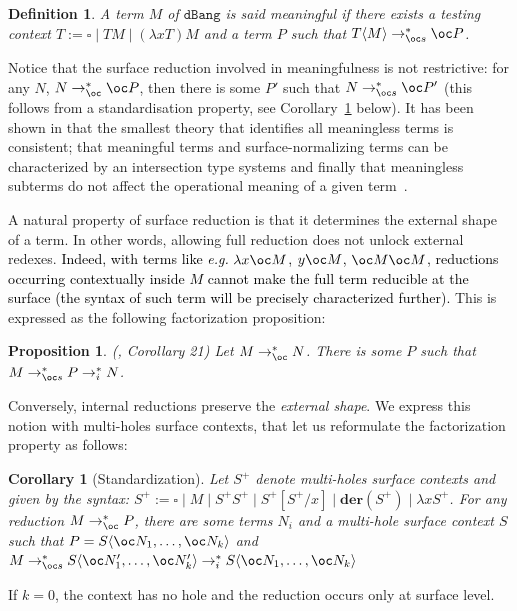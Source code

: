 \documentclass[10pt,a4paper]{article}
\newtheorem{proposition}[theorem]{Proposition}
\newtheorem{corollary}[theorem]{Corollary}
\newtheorem{definition}[theorem]{Definition}
\newcommand{\<}{\langle}
\renewcommand{\>}{\rangle}
\newcommand{\der}[1]{\ensuremath{\mathbf{der}(#1)}}
\newcommand{\dbang}{\ensuremath{\mathtt{dBang}}}
\newcommand{\todbs}{\to_{\oc s}} %
\newcommand{\todbf}{\to_{\oc}} %
\newcommand{\fnl}[1]{\textcolor{black}{#1}}
\begin{document}
\begin{definition}\label{def:dbang_meaningful}
	A term $M$ of $\dbang$ is said \emph{meaningful} if there exists a
	testing context $T:= \square \mid TM \mid (\lambda x T)M$ and a term $P$ such that $T\<M\>\todbs^*\oc P$.
\end{definition}

Notice that the surface reduction involved in meaningfulness is not
restrictive: for any $N$, $N\todbf^*\oc P$, then there is some $P'$
such that $N\todbs^*\oc P'$ (this follows from a standardisation
property, see Corollary~\ref{cor:standardisation_dbang} below). It has been shown in
\cite{kag24} that the smallest theory that
identifies all meaningless terms is consistent; that meaningful terms and surface-normalizing
terms can be characterized by an intersection type
systems and finally that meaningless subterms
do not affect the operational meaning of a given term~\cite[Proposition 8, Theorem 24 and Corollary
11]{kag24}.

A natural property of surface reduction is that it determines the external shape
of a term. In other words, allowing full reduction does not unlock external
redexes. \fnl{Indeed, with terms like \emph{e.g.} $\lambda x\oc M$, $y\oc M$, $\oc M\oc M$,
reductions occurring contextually inside $M$ cannot make the full term reducible
at the surface (the syntax of such term will be precisely characterized
further).} This is expressed as the following factorization  proposition:

\begin{proposition}\label{prop:standardisation_dbang}(\cite{agk24d}, Corollary
	21)
	Let $M\todbf^* N$. There is some $P$ such that $M\todbs^* P\to_i^* N$.
\end{proposition}
Conversely, internal reductions preserve the \emph{external shape}.  We express this notion with multi-holes
surface contexts, that let us reformulate the factorization property as follows:

\begin{corollary}[Standardization]\label{cor:standardisation_dbang}
	Let $S^+$ denote multi-holes surface contexts and given by the syntax:
	$
		S^+:= \square\mid M\mid	S^+S^+\mid S^+[S^+/x]\mid \der{S^+}\mid \lambda xS^+
	$.
	For any reduction $M\todbf^* P$, there are some terms $N_i$ and a
	multi-hole surface context $S$ such that $P=S\<\oc N_1,\dots ,\oc N_k\>$ and
	$
		M\todbs^*S\<\oc N_1',\dots ,\oc N_k'\>\to_i^*S\<\oc N_1,\dots ,\oc N_k\>
	$
\end{corollary}
If $k=0$,  the context has no hole and the reduction occurs only at surface level.
\end{document}
